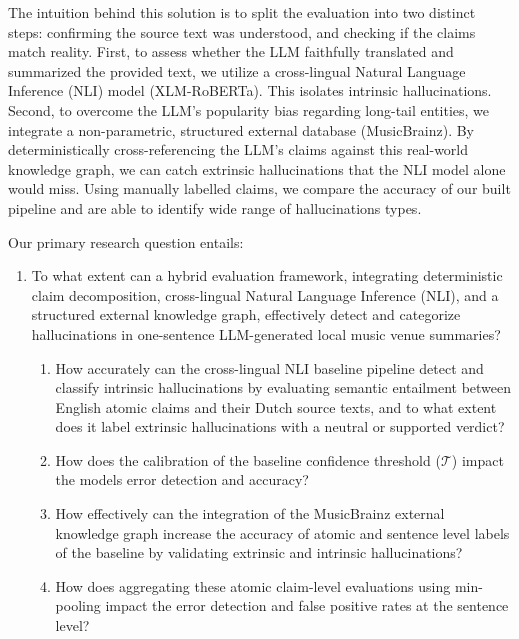 The intuition behind this solution is to split the evaluation into two distinct steps: confirming the source text was understood, and checking if the claims match reality. First, to assess whether the LLM faithfully translated and summarized the provided text, we utilize a cross-lingual Natural Language Inference (NLI) model (XLM-RoBERTa). This isolates intrinsic hallucinations. Second, to overcome the LLM's popularity bias regarding long-tail entities, we integrate a non-parametric, structured external database (MusicBrainz). By deterministically cross-referencing the LLM's claims against this real-world knowledge graph, we can catch extrinsic hallucinations that the NLI model alone would miss. Using manually labelled claims, we compare the accuracy of our built pipeline and are able to identify wide range of hallucinations types. 


Our primary research question entails: 
\begin{enumerate}
    \item[\textbf{RQ 1}] To what extent can a hybrid evaluation framework, integrating deterministic claim decomposition, cross-lingual Natural Language Inference (NLI), and a structured external knowledge graph, effectively detect and categorize hallucinations in one-sentence LLM-generated local music venue summaries?
    \begin{enumerate}
        \item[\textbf{RQ 1.1}] How accurately can the cross-lingual NLI baseline pipeline detect and classify intrinsic hallucinations by evaluating semantic entailment between English atomic claims and their Dutch source texts, and to what extent does it label extrinsic hallucinations with a neutral or supported verdict?
        \item[\textbf{RQ 1.2}] How does the calibration of the baseline confidence threshold ($\mathcal{T}$) impact the models error detection and accuracy? 
        \item[\textbf{RQ 1.3}] How effectively can the integration of the MusicBrainz external knowledge graph increase the accuracy of atomic and sentence level labels of the baseline by validating extrinsic and intrinsic hallucinations?
        \item[\textbf{RQ 1.4}] How does aggregating these atomic claim-level evaluations using min-pooling impact the  error detection and false positive rates at the sentence level?
    \end{enumerate}
\end{enumerate}

